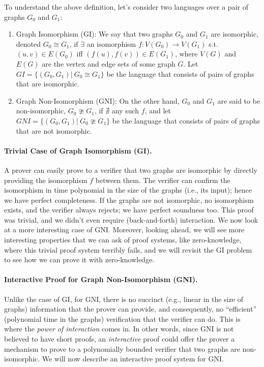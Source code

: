 \documentclass[12pt]{tufte-book}
\begin{document}
To understand the above definition, let's consider two languages over a pair of graphs $G_0$ and $G_1$: 
\begin{enumerate}
	\item Graph Isomorphism (GI): We say that two graphs $G_0$ and $G_1$ are isomorphic, denoted $G_0 \cong G_1$, if $\exists$ an isomorphism $f: V(G_0) \rightarrow V(G_1)$ s.t. $(u,v)\in E(G_0)$ iff $(f(u),f(v))\in E(G_1)$, where $V(G)$ and $E(G)$ are the vertex and edge sets of some graph $G$. Let $GI=\lbrace(G_0,G_1)|\  G_0\cong G_1\rbrace$ be the language that consists of pairs of graphs that are isomorphic.
	\item Graph Non-Isomorphism (GNI): On the other hand, $G_0$ and $G_1$ are said to be non-isomorphic, $G_0 \ncong G_1$, if $\nexists$ any such $f$, and let $GNI=\lbrace(G_0,G_1)|\  G_0\ncong G_1\rbrace$ be the language that consists of pairs of graphs that are not isomorphic.
\end{enumerate}

\paragraph{Trivial Case of Graph Isomorphism (GI).} A prover can easily prove to a verifier that two graphs are isomorphic by directly providing the isomorphism $f$ between them. The verifier can confirm the isomorphism in time polynomial in the size of the graphs (i.e., its input); hence we have perfect completeness. If the graphs are not isomorphic, no isomorphism exists, and the verifier always rejects; we have perfect soundness too. This proof was trivial, and we didn't even require (back-and-forth) interaction. We now look at a more interesting case of GNI. Moreover, looking ahead, we will see more interesting properties that we can ask of proof systems, like zero-knowledge, where this trivial proof system terribly fails, and we will revisit the GI problem to see how we can prove it with zero-knowledge.

\paragraph{Interactive Proof for Graph Non-Isomorphism (GNI).}  Unlike the case of GI, for GNI, there is no succinct (e.g., linear in the size of graphs) information that the prover can provide, and consequently, no ``efficient'' (polynomial time in the graphs) verification that the verifier can do. This is where the {\em power of interaction} comes in. In other words, since GNI is not believed to have short proofs, an {\em interactive} proof could offer the prover a mechanism to prove to a polynomially bounded verifier that two graphs are non-isomorphic. We will now describe an interactive proof system for GNI.
\end{document}
